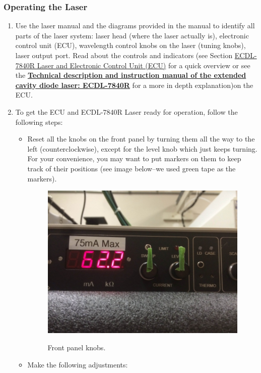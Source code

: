 \documentclass{../lab}
\begin{document}
\subsubsection{Operating the Laser}
\label{subsubsec:OperatingTheLaser}

\begin{enumerate}
    \item Use the laser manual and the diagrams provided in the manual to identify all parts of the laser system: laser head (where the laser actually is), electronic control unit (ECU), wavelength control knobs on the laser (tuning knobs), laser output port. Read about the controls and indicators (see Section \hyperref[subsec:ECDL7840RLaser]{ECDL-7840R Laser and Electronic Control Unit (ECU)} for a quick overview or see the \href{http://physics111.lib.berkeley.edu/Physics111/Equipment\_Manuals/manual\_D1\_ECDL\_laser.pdf}{\textbf{Technical description and instruction manual of the extended cavity diode laser: ECDL-7840R}} for a more in depth explanation)on the ECU.

    \item To get the ECU and ECDL-7840R Laser ready for operation, follow the following steps:
    \begin{itemize}
        \item Reset all the knobs on the front panel by turning them all the way to the left (counterclockwise), except for the level knob which just keeps turning. For your convenience, you may want to put markers on them to keep track of their positions (see image below--we used green tape as the markers).
        \begin{figure}[h]
        \centering
            \href{http://experimentationlab.berkeley.edu/sites/default/files/MNO_pics/800px-ECUknobs.jpg}{\includegraphics[width=0.5\linewidth]{images/800px-ECUknobs.jpg}}
            \caption{Front panel knobs.}
        \end{figure}

        \item Make the following adjustments:
    

\end{itemize}
\end{enumerate}
\end{document}
